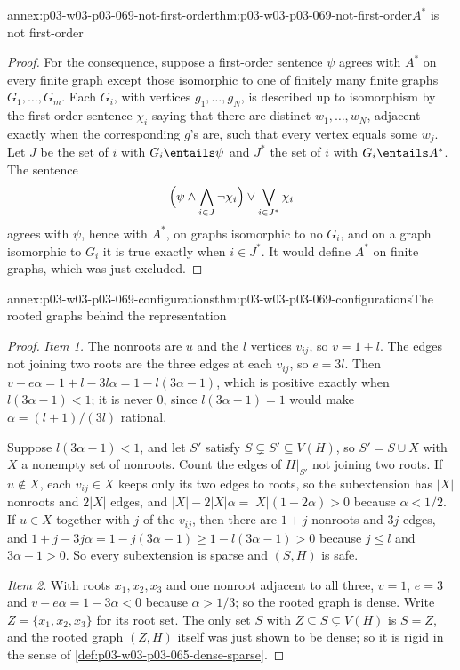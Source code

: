 \begin{annexitem}{annex:p03-w03-p03-069-not-first-order}{thm:p03-w03-p03-069-not-first-order}{\(A^*\) is not first-order}
\begin{proof}
For the consequence, suppose a first-order sentence \(\psi\) agrees with
\(A^*\) on every finite graph except those isomorphic to one of finitely many
finite graphs \(G_1,\ldots,G_m\).  Each \(G_i\), with vertices
\(g_1,\ldots,g_N\), is described up to isomorphism by the first-order sentence
\(\chi_i\) saying that there are distinct \(w_1,\ldots,w_N\), adjacent exactly
when the corresponding \(g\)'s are, such that every vertex equals some
\(w_j\).  Let \(J\) be the set of \(i\) with \(G_i\entails\psi\) and \(J^*\) the
set of \(i\) with \(G_i\entails A^*\).  The sentence
\[
  \Bigl(\psi\wedge\bigwedge_{i\in J}\neg\chi_i\Bigr)\vee\bigvee_{i\in J^*}\chi_i
\]
agrees with \(\psi\), hence with \(A^*\), on graphs isomorphic to no \(G_i\),
and on a graph isomorphic to \(G_i\) it is true exactly when \(i\in J^*\).  It
would define \(A^*\) on finite graphs, which was just excluded.
\end{proof}
\end{annexitem}

\begin{annexitem}{annex:p03-w03-p03-069-configurations}{thm:p03-w03-p03-069-configurations}{The rooted graphs behind the representation}
\begin{proof}
\emph{Item 1.}  The nonroots are \(u\) and the \(l\) vertices \(v_{ij}\), so
\(v=1+l\).  The edges not joining two roots are the three edges at each
\(v_{ij}\), so \(e=3l\).  Then \(v-e\alpha=1+l-3l\alpha=1-l(3\alpha-1)\), which
is positive exactly when \(l(3\alpha-1)<1\); it is never \(0\), since
\(l(3\alpha-1)=1\) would make \(\alpha=(l+1)/(3l)\) rational.

Suppose \(l(3\alpha-1)<1\), and let \(S'\) satisfy
\(S\subsetneq S'\subseteq V(H)\), so \(S'=S\cup X\) with \(X\) a nonempty set
of nonroots.  Count the edges of \(H|_{S'}\) not joining two roots.  If
\(u\notin X\), each \(v_{ij}\in X\) keeps only its two edges to roots, so the
subextension has \(|X|\) nonroots and \(2|X|\) edges, and
\(|X|-2|X|\alpha=|X|(1-2\alpha)>0\) because \(\alpha<1/2\).  If \(u\in X\)
together with \(j\) of the \(v_{ij}\), then there are \(1+j\) nonroots and
\(3j\) edges, and \(1+j-3j\alpha=1-j(3\alpha-1)\geq1-l(3\alpha-1)>0\) because
\(j\leq l\) and \(3\alpha-1>0\).  So every subextension is sparse and
\((S,H)\) is safe.

\emph{Item 2.}  With roots \(x_1,x_2,x_3\) and one nonroot adjacent to all
three, \(v=1\), \(e=3\) and \(v-e\alpha=1-3\alpha<0\) because \(\alpha>1/3\);
so the rooted graph is dense.  Write \(Z=\{x_1,x_2,x_3\}\) for its root
set.  The only set \(S\) with \(Z\subseteq S\subsetneq V(H)\) is \(S=Z\),
and the rooted graph \((Z,H)\) itself was just shown to be dense; so it is
rigid in the sense of \cref{def:p03-w03-p03-065-dense-sparse}.
\end{proof}
\end{annexitem}

